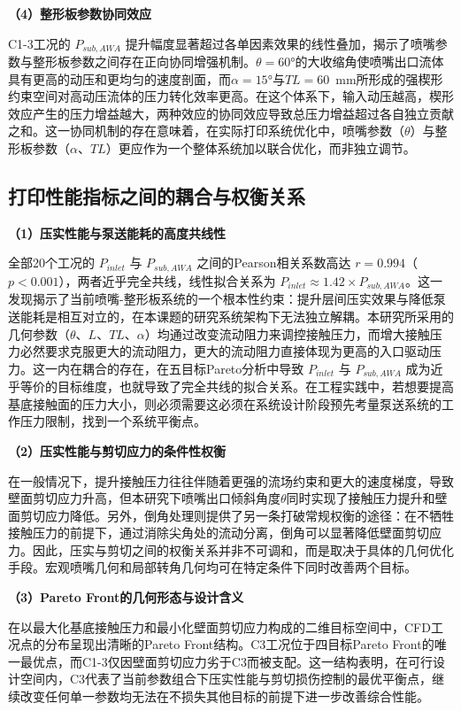 \textbf{（4）整形板参数协同效应}

C1-3工况的 $P_{sub,AWA}$ 提升幅度显著超过各单因素效果的线性叠加，揭示了喷嘴参数与整形板参数之间存在正向协同增强机制。$\theta=60°$的大收缩角使喷嘴出口流体具有更高的动压和更均匀的速度剖面，而$\alpha=15°$与$TL=60$~mm所形成的强楔形约束空间对高动压流体的压力转化效率更高。在这个体系下，输入动压越高，楔形效应产生的压力增益越大，两种效应的协同效应导致总压力增益超过各自独立贡献之和。这一协同机制的存在意味着，在实际打印系统优化中，喷嘴参数（$\theta$）与整形板参数（$\alpha$、$TL$）更应作为一个整体系统加以联合优化，而非独立调节。

\subsection{打印性能指标之间的耦合与权衡关系}

\textbf{（1）压实性能与泵送能耗的高度共线性}

全部20个工况的 $P_{inlet}$ 与 $P_{sub,AWA}$ 之间的Pearson相关系数高达 $r=0.994$（$p<0.001$），两者近乎完全共线，线性拟合关系为 $P_{inlet} \approx 1.42 \times P_{sub,AWA}$。这一发现揭示了当前喷嘴-整形板系统的一个根本性约束：提升层间压实效果与降低泵送能耗是相互对立的，在本课题的研究系统架构下无法独立解耦。本研究所采用的几何参数（$\theta$、$L$、$TL$、$\alpha$）均通过改变流动阻力来调控接触压力，而增大接触压力必然要求克服更大的流动阻力，更大的流动阻力直接体现为更高的入口驱动压力。这一内在耦合的存在，在五目标Pareto分析中导致 $P_{inlet}$ 与 $P_{sub,AWA}$ 成为近乎等价的目标维度，也就导致了完全共线的拟合关系。在工程实践中，若想要提高基底接触面的压力大小，则必须需要这必须在系统设计阶段预先考量泵送系统的工作压力限制，找到一个系统平衡点。

\textbf{（2）压实性能与剪切应力的条件性权衡}

在一般情况下，提升接触压力往往伴随着更强的流场约束和更大的速度梯度，导致壁面剪切应力升高，但本研究下喷嘴出口倾斜角度$\theta$同时实现了接触压力提升和壁面剪切应力降低。另外，倒角处理则提供了另一条打破常规权衡的途径：在不牺牲接触压力的前提下，通过消除尖角处的流动分离，倒角可以显著降低壁面剪切应力。因此，压实与剪切之间的权衡关系并非不可调和，而是取决于具体的几何优化手段。宏观喷嘴几何和局部转角几何均可在特定条件下同时改善两个目标。

\textbf{（3）Pareto Front的几何形态与设计含义}

在以最大化基底接触压力和最小化壁面剪切应力构成的二维目标空间中，CFD工况点的分布呈现出清晰的Pareto Front结构。C3工况位于四目标Pareto Front的唯一最优点，而C1-3仅因壁面剪切应力劣于C3而被支配。这一结构表明，在可行设计空间内，C3代表了当前参数组合下压实性能与剪切损伤控制的最优平衡点，继续改变任何单一参数均无法在不损失其他目标的前提下进一步改善综合性能。

